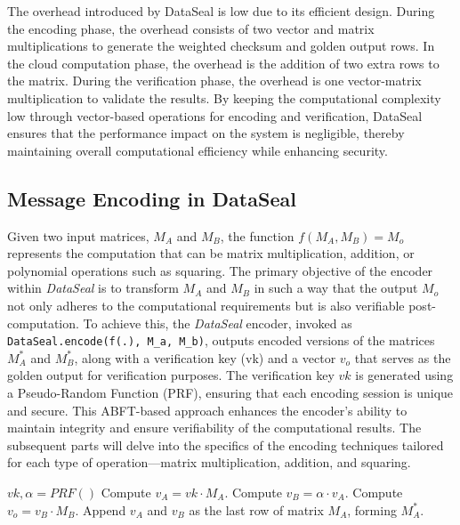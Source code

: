 The overhead introduced by DataSeal is low due to its efficient design. During the encoding phase, the overhead consists of two vector and matrix multiplications to generate the weighted checksum and golden output rows. In the cloud computation phase, the overhead is the addition of two extra rows to the matrix. During the verification phase, the overhead is one vector-matrix multiplication to validate the results. By keeping the computational complexity low through vector-based operations for encoding and verification, DataSeal ensures that the performance impact on the system is negligible, thereby maintaining overall computational efficiency while enhancing security.



\subsection{Message Encoding in DataSeal}
\label{s:setup}

Given two input matrices, \( M_A \) and \( M_B \), the function \( f(M_A, M_B) = M_o \) represents the computation that can be matrix multiplication, addition, or polynomial operations such as squaring. The primary objective of the encoder within \textit{DataSeal} is to transform \( M_A \) and \( M_B \) in such a way that the output \( M_o \) not only adheres to the computational requirements but is also verifiable post-computation. To achieve this, the \textit{DataSeal} encoder, invoked as \texttt{DataSeal.encode(f(.), M\_a, M\_b)}, outputs encoded versions of the matrices \( M^*_A \) and \( M^*_B \), along with a verification key (vk) and a vector \( v_o \) that serves as the golden output for verification purposes. The verification key \( vk \) is generated using a Pseudo-Random Function (PRF), ensuring that each encoding session is unique and secure. This ABFT-based approach enhances the encoder’s ability to maintain integrity and ensure verifiability of the computational results. The subsequent parts will delve into the specifics of the encoding techniques tailored for each type of operation---matrix multiplication, addition, and squaring.

\begin{algorithm}
\caption{\texttt{DataSeal.encode(f(X), M\_A, M\_B)}}
\label{alg:enc_multiplication}
\begin{algorithmic}[1]
\STATE $vk, \alpha = PRF()$
\STATE Compute $v_A = vk \cdotp M_A$.
\STATE Compute $v_B = \alpha \cdotp v_A$.
\STATE Compute $v_o = v_B \cdotp M_B$.
\STATE Append $v_A$ and $v_B$ as the last row of matrix $M_A$, forming $M^*_A$.
\end{algorithmic}
\end{algorithm}

